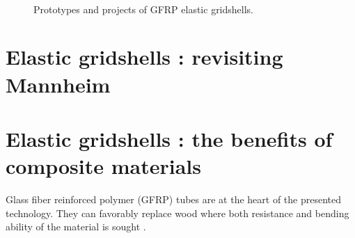 \begin{figure}[h]
		\captionsetup[subfloat]{captionskip=10pt}
		\\
		\hspace*{\fill}
		\vspace{10pt}
		\caption{Prototypes and projects of GFRP elastic gridshells.}
		\label{fig:proto}    
\end{figure}
%


\section{Elastic gridshells : revisiting Mannheim}


\section{Elastic gridshells : the benefits of composite materials}

Glass fiber reinforced polymer (GFRP) tubes are at the heart of the presented technology. They can favorably replace wood where both resistance and bending ability of the material is sought \cite{Douthe2010}. 

